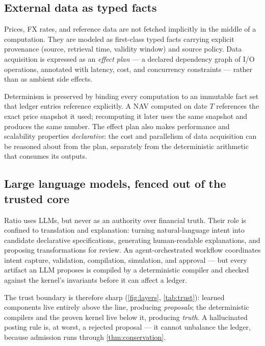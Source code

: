 \subsection{External data as typed facts}

Prices, FX rates, and reference data are not fetched implicitly in the
middle of a computation. They are modeled as first-class typed facts
carrying explicit provenance (source, retrieval time, validity window)
and source policy. Data acquisition is expressed as an \emph{effect plan}
--- a declared dependency graph of I/O operations, annotated with
latency, cost, and concurrency constraints --- rather than as ambient
side effects.

Determinism is preserved by binding every computation to an immutable
fact set that ledger entries reference explicitly. A NAV computed on
date $T$ references the exact price snapshot it used; recomputing it later
uses the same snapshot and produces the same number. The effect plan also
makes performance and scalability properties \emph{declarative}: the cost
and parallelism of data acquisition can be reasoned about from the plan,
separately from the deterministic arithmetic that consumes its outputs.

\subsection{Large language models, fenced out of the trusted core}

Ratio uses LLMs, but never as an authority over financial truth. Their
role is confined to translation and explanation: turning natural-language
intent into candidate declarative specifications, generating
human-readable explanations, and proposing transformations for review. An
agent-orchestrated workflow coordinates intent capture, validation,
compilation, simulation, and approval --- but every artifact an LLM
proposes is compiled by a deterministic compiler and checked against the
kernel's invariants before it can affect a ledger.

The trust boundary is therefore sharp (\cref{fig:layers}, \cref{tab:trust}):
learned components live entirely above the line, producing \emph{proposals};
the deterministic compilers and the proven kernel live below it,
producing \emph{truth}. A hallucinated posting rule is, at worst, a
rejected proposal --- it cannot unbalance the ledger, because admission
runs through \cref{thm:conservation}.
